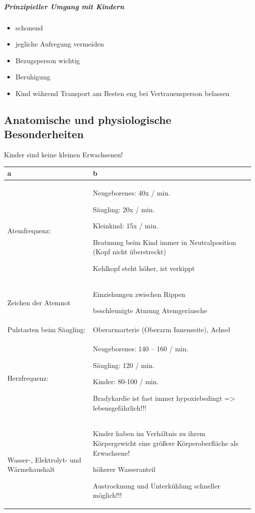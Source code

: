 \author{Michael Withofner, Dr. med. univ.}

\subparagraph*{Prinzipieller Umgang mit Kindern}

\begin{itemize}
\item schonend
\item jegliche Aufregung vermeiden
\item Bezugsperson wichtig
\item Beruhigung
\item Kind während Transport am Besten eng bei  Vertrauensperson belassen
\end{itemize}





\subsection{Anatomische und physiologische  Besonderheiten}

Kinder sind keine kleinen  Erwachsenen!

\begin{center}
\begin{tabulary}{12cm}{LL}\toprule
a
&
b
\\\midrule
Atemfrequenz:
&
{\mdseries Neugeborenes: 40x / min.}

{\mdseries Säugling: 20x / min.}

{\mdseries Kleinkind: 15x / min.}

{\mdseries Beatmung beim Kind immer in  Neutralposition (Kopf nicht
\"uberstreckt)}

{\mdseries Kehlkopf steht höher, ist verkippt}

\\\hline
Zeichen der Atemnot
&
Einziehungen zwischen Rippen

beschleunigte Atmung
Atemgeräusche
\\\hline
Pulstasten beim Säugling:
&
Oberarmarterie (Oberarm Innenseite), Achsel
\\\hline
Herzfrequenz:
&
{\mdseries Neugeborenes: 140 -- 160 / min.}

{\mdseries Säugling: 120 / min.}

{\mdseries Kinder: 80-100 / min.}

{\mdseries Bradykardie  ist fast immer  hypoxiebedingt ={\textgreater}
lebensgefährlich!!!}

\\\hline
Wasser-, Elektrolyt- und Wärmehaushalt
&
{\mdseries Kinder haben im Verhältnis zu ihrem  Körpergewicht eine
grö{\ss}ere Körperoberfläche  als Erwachsene!}

{\mdseries höherer Wasseranteil}

{\mdseries Austrocknung und Unterk\"uhlung schneller  möglich!!!}
\\\bottomrule
\end{tabulary}
\end{center}


